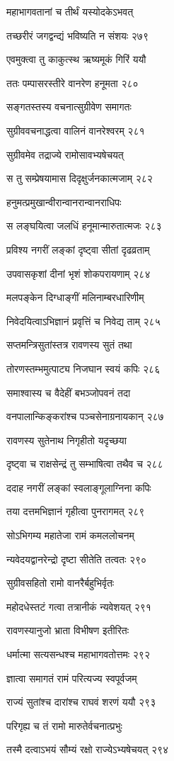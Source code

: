 महाभागवतानां च तीर्थं यस्योदकेऽभवत्

तच्छरीरं जगद्वन्द्यं भविष्यति न संशयः २७९

एवमुक्त्वा तु काकुत्स्थ ऋष्यमूकं गिरिं ययौ

ततः पम्पासरस्तीरे वानरेण हनूमता २८०

सङ्गतस्तस्य वचनात्सुग्रीवेण समागतः

सुग्रीववचनाद्धत्वा वालिनं वानरेश्वरम् २८१

सुग्रीवमेव तद्राज्ये रामोसावभ्यषेचयत्

स तु सम्प्रेषयामास दिदृक्षुर्जनकात्मजाम् २८२

हनुमत्प्रमुखान्वीरान्वानरान्वानराधिपः

स लङ्घयित्वा जलधिं हनूमान्मारुतात्मजः २८३

प्रविश्य नगरीं लङ्कां दृष्ट्वा सीतां दृढव्रताम्

उपवासकृशां दीनां भृशं शोकपरायणाम् २८४

मलपङ्केन दिग्धाङ्गीं मलिनाम्बरधारिणीम्

निवेदयित्वाऽभिज्ञानं प्रवृत्तिं च निवेद्य ताम् २८५

सप्तमन्त्रिसुतांस्तत्र रावणस्य सुतं तथा

तोरणस्तम्भमुत्पाट्य निजघान स्वयं कपिः २८६

समाश्वास्य च वैदेहीं बभञ्जोपवनं तदा

वनपालान्किङ्करांश्च पञ्चसेनाग्रनायकान् २८७

रावणस्य सुतेनाथ निगृहीतो यदृच्छया

दृष्ट्वा च राक्षसेन्द्रं तु सम्भाषित्वा तथैव च २८८

ददाह नगरीं लङ्कां स्वलाङ्गूलाग्निना कपिः

तया दत्तमभिज्ञानं गृहीत्वा पुनरागमत् २८९

सोऽभिगम्य महातेजा रामं कमललोचनम्

न्यवेदयद्वानरेन्द्रो दृष्टा सीतेति तत्वतः २९०

सुग्रीवसहितो रामो वानरैर्बहुभिर्वृतः

महोदधेस्तटं गत्वा तत्रानीकं न्यवेशयत् २९१

रावणस्यानुजो भ्राता विभीषण इतीरितः

धर्मात्मा सत्यसन्धश्च महाभागवतोत्तमः २९२

ज्ञात्वा समागतं रामं परित्यज्य स्वपूर्वजम्

राज्यं सुतांश्च दारांश्च राघवं शरणं ययौ २९३

परिगृह्य च तं रामो मारुतेर्वचनात्प्रभुः

तस्मै दत्वाऽभयं सौम्यं रक्षो राज्येऽभ्यषेचयत् २९४

